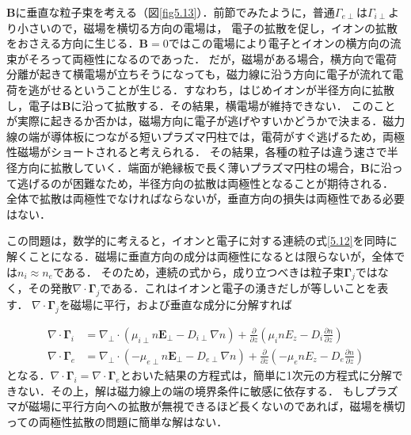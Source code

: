 \documentclass{ltjsarticle}
\numberwithin{equation}{section} %
\begin{document}
$\bm{B}$に垂直な粒子束を考える（図\ref{fig5.13}）．前節でみたように，普通$\Gamma_{e\perp}$は$\Gamma_{i\perp}$より小さいので，磁場を横切る方向の電場は，
電子の拡散を促し，イオンの拡散をおさえる方向に生じる．$\bm{B}=0$ではこの電場により電子とイオンの横方向の流束がそろって両極性になるのであった．
だが，磁場がある場合，横方向で電荷分離が起きて横電場が立ちそうになっても，磁力線に沿う方向に電子が流れて電荷を逃がせるということが生じる．すなわち，はじめイオンが半径方向に拡散し，電子は$\bm{B}$に沿って拡散する．その結果，横電場が維持できない．
このことが実際に起きるか否かは，磁場方向に電子が逃げやすいかどうかで決まる．磁力線の端が導体板につながる短いプラズマ円柱では，電荷がすぐ逃げるため，両極性磁場がショートされると考えられる．
その結果，各種の粒子は違う速さで半径方向に拡散していく．端面が絶縁板で長く薄いプラズマ円柱の場合，$\bm{B}$に沿って逃げるのが困難なため，半径方向の拡散は両極性となることが期待される．
全体で拡散は両極性でなければならないが，垂直方向の損失は両極性である必要はない．

この問題は，数学的に考えると，イオンと電子に対する連続の式\eqref{5.12}を同時に解くことになる．磁場に垂直方向の成分は両極性になるとは限らないが，全体では$n_i\approx n_e$である．
そのため，連続の式から，成り立つべきは粒子束$\bm{\Gamma}_j$ではなく，その発散$\nabla\cdot \bm{\Gamma}_j$である．これはイオンと電子の湧きだしが等しいことを表す．
$\nabla \cdot \bm{\Gamma}_j$を磁場に平行，および垂直な成分に分解すれば

\begin{equation}
  \begin{aligned}
    \nabla \cdot \bm{\Gamma}_i &= \nabla_\perp \cdot (\mu_{i\perp} n\bm{E}_\perp - D_{i\perp}\nabla n) + \frac{\partial}{\partial z}\left(\mu_inE_z - D_i\frac{\partial n}{\partial z}\right)\\
    \nabla \cdot \bm{\Gamma}_e &= \nabla_\perp \cdot (-\mu_{e\perp} n\bm{E}_\perp - D_{e\perp}\nabla n) + \frac{\partial}{\partial z}\left(-\mu_enE_z - D_e\frac{\partial n}{\partial z}\right)
  \end{aligned} \label{5.57}
\end{equation}
となる．$\nabla \cdot \bm{\Gamma}_i = \nabla \cdot \bm{\Gamma}_e$とおいた結果の方程式は，簡単に1次元の方程式に分解できない．その上，解は磁力線上の端の境界条件に敏感に依存する．
もしプラズマが磁場に平行方向への拡散が無視できるほど長くないのであれば，磁場を横切っての両極性拡散の問題に簡単な解はない．
\end{document}
